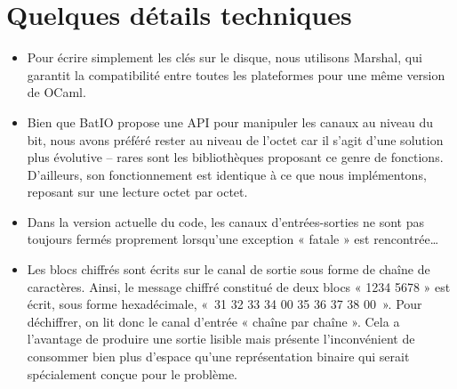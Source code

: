 \section{Quelques détails techniques}
\label{annexe_ocaml}

\begin{itemize}
\item Pour écrire simplement les clés sur le disque, nous utilisons Marshal, qui garantit la compatibilité entre toutes les plateformes pour une même version de OCaml.
\item Bien que BatIO propose une API pour manipuler les canaux au niveau du bit, nous avons préféré rester au niveau de l'octet car il s'agit d'une solution plus évolutive – rares sont les bibliothèques proposant ce genre de fonctions. D'ailleurs, son fonctionnement est identique à ce que nous implémentons, reposant sur une lecture octet par octet.
\item Dans la version actuelle du code, les canaux d'entrées-sorties ne sont pas toujours fermés proprement lorsqu'une exception « fatale » est rencontrée…
\item Les blocs chiffrés sont écrits sur le canal de sortie sous forme de chaîne de caractères. Ainsi, le message chiffré constitué de deux blocs « 1234 5678 » est écrit, sous forme hexadécimale, «~31 32 33 34 00 35 36 37 38 00~». Pour déchiffrer, on lit donc le canal d'entrée « chaîne par chaîne ». Cela a l'avantage de produire une sortie lisible mais présente l'inconvénient de consommer bien plus d'espace qu'une représentation binaire qui serait spécialement conçue pour le problème.
\end{itemize}
